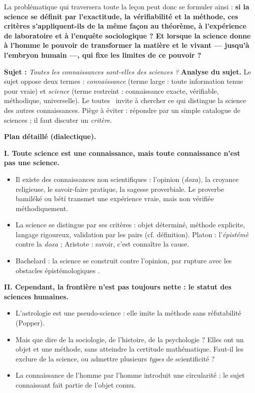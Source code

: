 \documentclass[11pt]{article}
\begin{document}
La problématique qui traversera toute la leçon peut donc se formuler ainsi : \textbf{si la science se définit par l'exactitude, la vérifiabilité et la méthode, ces critères s'appliquent-ils de la même façon au théorème, à l'expérience de laboratoire et à l'enquête sociologique ? Et lorsque la science donne à l'homme le pouvoir de transformer la matière et le vivant — jusqu'à l'embryon humain —, qui fixe les limites de ce pouvoir ?}

\begin{exoresolu}
\textbf{Sujet :} \emph{Toutes les connaissances sont-elles des sciences ?}
\tcblower
\textbf{Analyse du sujet.} Le sujet oppose deux termes : \emph{connaissance} (terme large : toute information tenue pour vraie) et \emph{science} (terme restreint : connaissance exacte, vérifiable, méthodique, universelle). Le \guillemotleft toutes \guillemotright\ invite à chercher ce qui distingue la science des autres connaissances. Piège à éviter : répondre par un simple catalogue de sciences ; il faut discuter un \emph{critère}.

\textbf{Plan détaillé (dialectique).}

\textbf{I. Toute science est une connaissance, mais toute connaissance n'est pas une science.}
\begin{itemize}
\item Il existe des connaissances non scientifiques : l'opinion (\emph{doxa}), la croyance religieuse, le savoir-faire pratique, la sagesse proverbiale. Le proverbe bamiléké ou bétí transmet une expérience vraie, mais non vérifiée méthodiquement.
\item La science se distingue par ses critères : objet déterminé, méthode explicite, langage rigoureux, validation par les pairs (cf. définition). Platon : l'\emph{épistémè} contre la \emph{doxa} ; Aristote : savoir, c'est connaître la cause.
\item Bachelard : la science se construit contre l'opinion, par rupture avec les \guillemotleft obstacles épistémologiques \guillemotright.
\end{itemize}

\textbf{II. Cependant, la frontière n'est pas toujours nette : le statut des sciences humaines.}
\begin{itemize}
\item L'astrologie est une pseudo-science : elle imite la méthode sans réfutabilité (Popper).
\item Mais que dire de la sociologie, de l'histoire, de la psychologie ? Elles ont un objet et une méthode, sans atteindre la certitude mathématique. Faut-il les exclure de la science, ou admettre plusieurs \emph{types} de scientificité ?
\item La connaissance de l'homme par l'homme introduit une circularité : le sujet connaissant fait partie de l'objet connu.
\end{itemize}


\end{exoresolu}
\end{document}
